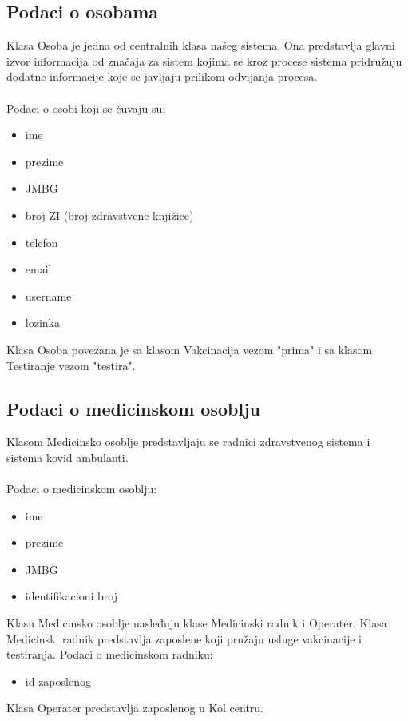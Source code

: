\documentclass[titlepage]{article}
\begin{document}
\subsection{Podaci o osobama}

Klasa Osoba je jedna od centralnih klasa našeg sistema. Ona predstavlja glavni izvor informacija od značaja za sistem kojima se kroz procese sistema pridružuju dodatne informacije koje se javljaju prilikom odvijanja procesa. \\ \\
Podaci o osobi koji se čuvaju su:

\begin{itemize}
    \item ime
    \item prezime
    \item JMBG
    \item broj ZI (broj zdravstvene knjižice)
    \item telefon
    \item email
    \item username
    \item lozinka
\end{itemize}

Klasa Osoba povezana je sa klasom Vakcinacija vezom "prima" i sa klasom Testiranje vezom "testira".

\subsection{Podaci o medicinskom osoblju}
Klasom Medicinsko osoblje predstavljaju se radnici zdravstvenog sistema i sistema kovid ambulanti.\\ \\
Podaci o medicinskom osoblju:
\begin{itemize}
    \item ime
    \item prezime
    \item JMBG
    \item identifikacioni broj
\end{itemize}
Klasu Medicinsko osoblje nasleđuju klase Medicinski radnik i Operater. Klasa Medicinski radnik predstavlja zaposlene koji pružaju usluge vakcinacije i testiranja. 
Podaci o medicinskom radniku:
\begin{itemize}
    \item id zaposlenog
\end{itemize}
Klasa Operater predstavlja zaposlenog u Kol centru.
\end{document}
